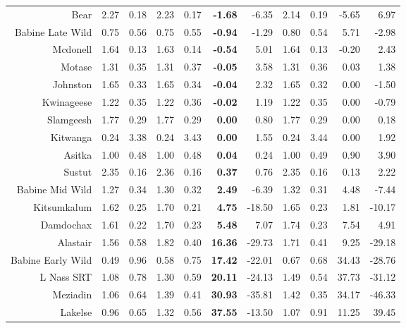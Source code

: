 \documentclass[french,11pt]{book}
\begin{document}
\begin{longtable}[t]{rrrrr>{}rrrrrr}
\midrule Bear & 2.27 & 0.18 & 2.23 & 0.17 & \textbf{-1.68} & -6.35 & 2.14 & 0.19 & -5.65 & 6.97\\ Babine Late Wild & 0.75 & 0.56 & 0.75 & 0.55 & \textbf{-0.94} & -1.29 & 0.80 & 0.54 & 5.71 & -2.98\\ Mcdonell & 1.64 & 0.13 & 1.63 & 0.14 & \textbf{-0.54} & 5.01 & 1.64 & 0.13 & -0.20 & 2.43\\ Motase & 1.31 & 0.35 & 1.31 & 0.37 & \textbf{-0.05} & 3.58 & 1.31 & 0.36 & 0.03 & 1.38\\ Johnston & 1.65 & 0.33 & 1.65 & 0.34 & \textbf{-0.04} & 2.32 & 1.65 & 0.32 & 0.00 & -1.50\\ Kwinageese & 1.22 & 0.35 & 1.22 & 0.36 & \textbf{-0.02} & 1.19 & 1.22 & 0.35 & 0.00 & -0.79\\ Slamgeesh & 1.77 & 0.29 & 1.77 & 0.29 & \textbf{0.00} & 0.80 & 1.77 & 0.29 & 0.00 & 0.18\\ Kitwanga & 0.24 & 3.38 & 0.24 & 3.43 & \textbf{0.00} & 1.55 & 0.24 & 3.44 & 0.00 & 1.92\\ Asitka & 1.00 & 0.48 & 1.00 & 0.48 & \textbf{0.04} & 0.24 & 1.00 & 0.49 & 0.90 & 3.90\\ Sustut & 2.35 & 0.16 & 2.36 & 0.16 & \textbf{0.37} & 0.76 & 2.35 & 0.16 & 0.13 & 2.22\\ Babine Mid Wild & 1.27 & 0.34 & 1.30 & 0.32 & \textbf{2.49} & -6.39 & 1.32 & 0.31 & 4.48 & -7.44\\ Kitsumkalum & 1.62 & 0.25 & 1.70 & 0.21 & \textbf{4.75} & -18.50 & 1.65 & 0.23 & 1.81 & -10.17\\
\midrule Damdochax & 1.61 & 0.22 & 1.70 & 0.23 & \textbf{5.48} & 7.07 & 1.74 & 0.23 & 7.54 & 4.91\\ Alastair & 1.56 & 0.58 & 1.82 & 0.40 & \textbf{16.36} & -29.73 & 1.71 & 0.41 & 9.25 & -29.18\\ Babine Early Wild & 0.49 & 0.96 & 0.58 & 0.75 & \textbf{17.42} & -22.01 & 0.67 & 0.68 & 34.43 & -28.76\\ L Nass SRT & 1.08 & 0.78 & 1.30 & 0.59 & \textbf{20.11} & -24.13 & 1.49 & 0.54 & 37.73 & -31.12\\ Meziadin & 1.06 & 0.64 & 1.39 & 0.41 & \textbf{30.93} & -35.81 & 1.42 & 0.35 & 34.17 & -46.33\\ Lakelse & 0.96 & 0.65 & 1.32 & 0.56 & \textbf{37.55} & -13.50 & 1.07 & 0.91 & 11.25 & 39.45\\* \end{longtable}

\endgroup{} \endgroup{}

\clearpage
\end{document}
